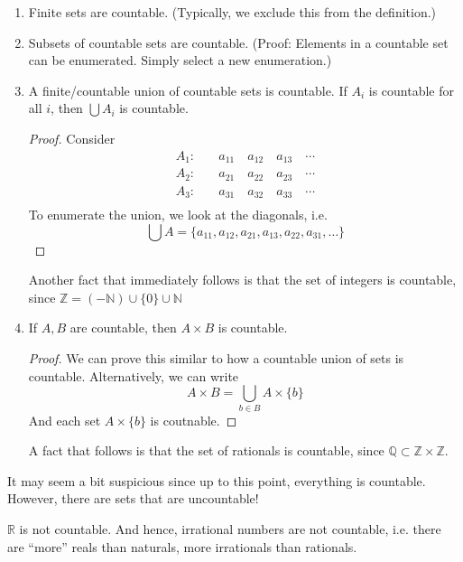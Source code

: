 \documentclass{article}
\begin{document}
\begin{enumerate}
    \item Finite sets are countable. (Typically, we exclude this from the definition.)
    \item Subsets of countable sets are countable. (Proof: Elements in a countable set can be enumerated. Simply select a new enumeration.)
    \item A finite/countable union of countable sets is countable. If $A_i$ is countable for all $i$, then $\bigcup A_i$ is countable.
          \begin{proof}
              Consider
              \begin{align*}
                  A_1: & \quad a_{11}\quad a_{12}\quad a_{13}\quad \cdots \\
                  A_2: & \quad a_{21}\quad a_{22}\quad a_{23}\quad \cdots \\
                  A_3: & \quad a_{31}\quad a_{32}\quad a_{33}\quad \cdots \\
              \end{align*}
              To enumerate the union, we look at the diagonals, i.e.
              \begin{equation}
                  \bigcup A = \{a_{11}, a_{12}, a_{21}, a_{13}, a_{22}, a_{31}, \dots \}
              \end{equation}
          \end{proof}
          Another fact that immediately follows is that the set of integers is countable, since $\mathbb{Z} = (-\mathbb{N})\cup \{0\} \cup \mathbb{N}$
    \item If $A,B$ are countable, then $A\times B$ is countable.
          \begin{proof}
              We can prove this similar to how a countable union of sets is countable. Alternatively, we can write
              \begin{equation}
                  A\times B = \bigcup_{b\in B} A \times \{b\}
              \end{equation}
              And each set $A\times \{b\}$ is coutnable.
          \end{proof}
          A fact that follows is that the set of rationals is countable, since $\mathbb{Q} \subset \mathbb{Z}\times \mathbb{Z}.$
\end{enumerate}
It may seem a bit suspicious since up to this point, everything is countable. However, there are sets that are uncountable!
\begin{theorem}
    $\mathbb{R}$ is not countable. And hence, irrational numbers are not countable, i.e. there are ``more'' reals than naturals, more irrationals than rationals.
\end{theorem}
\end{document}
